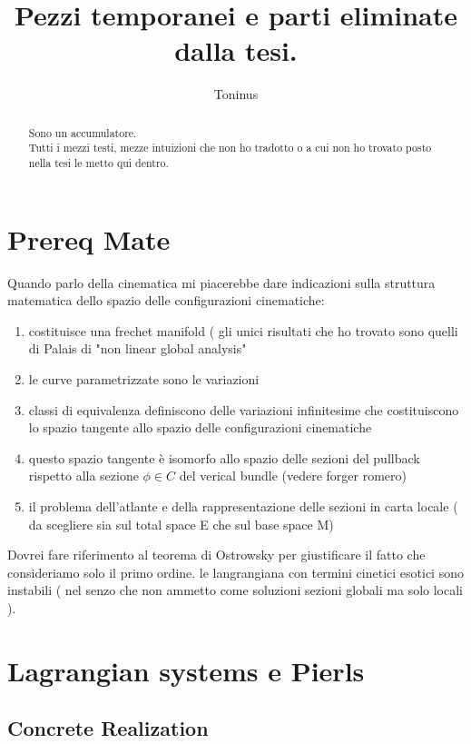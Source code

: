 \documentclass[Main]{subfiles}
\title{Pezzi temporanei e parti eliminate dalla tesi. }
\author{Toninus}
\begin{document}
\maketitle
\begin{abstract}
	Sono un accumulatore.\\
	Tutti i mezzi testi, mezze intuizioni che non ho tradotto o a cui non ho trovato posto nella tesi le metto qui dentro.
\end{abstract}


\chapter{Prereq Mate}
	Quando parlo della cinematica mi piacerebbe dare indicazioni sulla struttura matematica dello spazio delle configurazioni cinematiche:
			\begin{enumerate}
				\item costituisce una frechet manifold ( gli unici risultati che ho trovato sono quelli di Palais di "non linear global analysis"
				\item le curve parametrizzate sono le variazioni
				\item classi di equivalenza definiscono delle variazioni infinitesime che costituiscono lo spazio tangente allo spazio delle configurazioni cinematiche
				\item questo spazio tangente è isomorfo allo spazio delle sezioni del pullback rispetto alla sezione $\phi\in C$ del verical bundle (vedere forger romero)
				\item il problema dell'atlante e della rappresentazione delle sezioni in carta locale ( da scegliere sia sul total space E che sul base space M)
			\end{enumerate}
	
	Dovrei fare riferimento al teorema di Ostrowsky per giustificare il fatto che consideriamo solo il primo ordine. le langrangiana con termini cinetici esotici sono instabili ( nel senzo che non ammetto come soluzioni sezioni globali ma solo locali ).






\chapter{Lagrangian systems e Pierls}
	\section{Concrete Realization}
\end{document}
